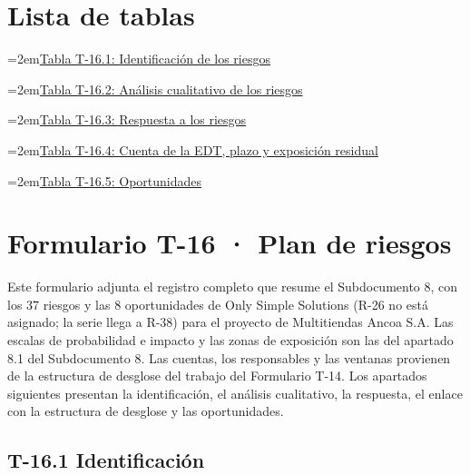 \documentclass[11pt]{article}
\begin{document}
\tableofcontents
\clearpage
\section*{Lista de tablas}

\noindent\hangindent=2em\hyperref[tab:t16-1]{Tabla T-16.1: Identificación de los riesgos}\dotfill\pageref{tab:t16-1}\par\vspace{0.4\baselineskip}
\noindent\hangindent=2em\hyperref[tab:t16-2]{Tabla T-16.2: Análisis cualitativo de los riesgos}\dotfill\pageref{tab:t16-2}\par\vspace{0.4\baselineskip}
\noindent\hangindent=2em\hyperref[tab:t16-3]{Tabla T-16.3: Respuesta a los riesgos}\dotfill\pageref{tab:t16-3}\par\vspace{0.4\baselineskip}
\noindent\hangindent=2em\hyperref[tab:t16-4]{Tabla T-16.4: Cuenta de la EDT, plazo y exposición residual}\dotfill\pageref{tab:t16-4}\par\vspace{0.4\baselineskip}
\noindent\hangindent=2em\hyperref[tab:t16-5]{Tabla T-16.5: Oportunidades}\dotfill\pageref{tab:t16-5}\par\vspace{0.4\baselineskip}
\clearpage


\renewcommand{\tablename}{Tabla}
\renewcommand{\thetable}{T-16.\arabic{table}}

\section{Formulario T-16 · Plan de riesgos}\label{formulario-t-16}

Este formulario adjunta el registro completo que resume el Subdocumento 8, con los 37 riesgos y las 8 oportunidades de Only Simple Solutions (R-26 no está asignado; la serie llega a R-38) para el proyecto de Multitiendas Ancoa S.A. Las escalas de probabilidad e impacto y las zonas de exposición son las del apartado 8.1 del Subdocumento 8. Las cuentas, los responsables y las ventanas provienen de la estructura de desglose del trabajo del Formulario T-14. Los apartados siguientes presentan la identificación, el análisis cualitativo, la respuesta, el enlace con la estructura de desglose y las oportunidades.

\subsection{T-16.1 Identificación}
\end{document}
